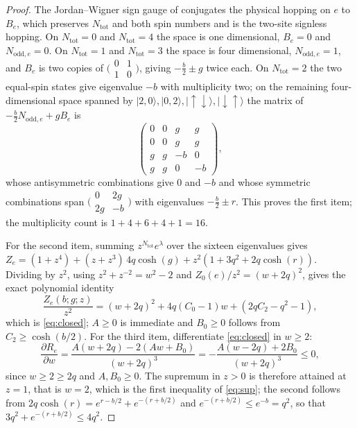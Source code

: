 \documentclass[11pt]{article}
\theoremstyle{plain}
\theoremstyle{definition}
\newcommand{\NoddE}{N_{\mathrm{odd},e}}
\begin{document}
\begin{proof}
The Jordan--Wigner sign gauge of \cite[Section 4]{rens2026a} conjugates the physical
hopping on $e$ to $B_e$, which preserves $N_{\mathrm{tot}}$ and both spin numbers and
is the two-site signless hopping. On $N_{\mathrm{tot}}=0$ and $N_{\mathrm{tot}}=4$ the
space is one dimensional, $B_e=0$ and $\NoddE=0$. On $N_{\mathrm{tot}}=1$ and
$N_{\mathrm{tot}}=3$ the space is four dimensional, $\NoddE=1$, and $B_e$ is two
copies of $\bigl(\begin{smallmatrix}0&1\\1&0\end{smallmatrix}\bigr)$, giving
$-\tfrac{b}{2}\pm g$ twice each. On $N_{\mathrm{tot}}=2$ the two equal-spin states
give eigenvalue $-b$ with multiplicity two; on the remaining four-dimensional space
spanned by $|2,0\rangle,|0,2\rangle,|\uparrow\downarrow\rangle,|\downarrow\uparrow\rangle$
the matrix of $-\tfrac{b}{2}\NoddE+gB_e$ is
\[
\begin{pmatrix}0&0&g&g\\0&0&g&g\\g&g&-b&0\\g&g&0&-b\end{pmatrix},
\]
whose antisymmetric combinations give $0$ and $-b$ and whose symmetric combinations
span $\bigl(\begin{smallmatrix}0&2g\\2g&-b\end{smallmatrix}\bigr)$ with eigenvalues
$-\tfrac{b}{2}\pm r$. This proves the first item; the multiplicity count is
$1+4+6+4+1=16$.

For the second item, summing $z^{N_{\mathrm{tot}}}e^{\lambda}$ over the sixteen
eigenvalues gives
$Z_e=(1+z^{4})+(z+z^{3})\,4q\cosh(g)+z^{2}(1+3q^{2}+2q\cosh(r))$. Dividing by
$z^{2}$, using $z^{2}+z^{-2}=w^{2}-2$ and $Z_0(e)/z^{2}=(w+2q)^{2}$, gives the exact
polynomial identity
\[
\frac{Z_e(b;g;z)}{z^{2}}=(w+2q)^{2}+4q(C_0-1)w+(2qC_2-q^{2}-1),
\]
which is \eqref{eq:closed}; $A\ge0$ is immediate and $B_0\ge0$ follows from
$C_2\ge\cosh(b/2)$. For the third item, differentiate \eqref{eq:closed} in
$w\ge2$:
\[
\frac{\partial R_e}{\partial w}
=\frac{A(w+2q)-2(Aw+B_0)}{(w+2q)^{3}}
=-\frac{A(w-2q)+2B_0}{(w+2q)^{3}}\le0,
\]
since $w\ge2\ge2q$ and $A,B_0\ge0$. The supremum in $z>0$ is therefore attained at
$z=1$, that is $w=2$, which is the first inequality of \eqref{eq:sup}; the second
follows from $2q\cosh(r)=e^{r-b/2}+e^{-(r+b/2)}$ and
$e^{-(r+b/2)}\le e^{-b}=q^{2}$, so that
$3q^{2}+e^{-(r+b/2)}\le4q^{2}$.
\end{proof}
\end{document}

